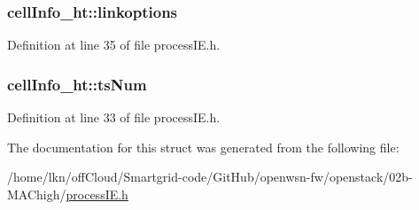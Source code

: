 \subsubsection[{\texorpdfstring{linkoptions}{linkoptions}}]{ cell\+Info\+\_\+ht\+::linkoptions}\hypertarget{structcell_info__ht_a964b11e7bb93170b463d82ad7b79e1ee}{}\label{structcell_info__ht_a964b11e7bb93170b463d82ad7b79e1ee}


Definition at line 35 of file process\+I\+E.\+h.

\subsubsection[{\texorpdfstring{ts\+Num}{tsNum}}]{ cell\+Info\+\_\+ht\+::ts\+Num}\hypertarget{structcell_info__ht_ad66acb072768400ef35d293a4c887d3d}{}\label{structcell_info__ht_ad66acb072768400ef35d293a4c887d3d}


Definition at line 33 of file process\+I\+E.\+h.



The documentation for this struct was generated from the following file\+:\begin{DoxyCompactItemize}
\item 
/home/lkn/off\+Cloud/\+Smartgrid-\/code/\+Git\+Hub/openwsn-\/fw/openstack/02b-\/\+M\+A\+Chigh/\hyperlink{process_i_e_8h}{process\+I\+E.\+h}\end{DoxyCompactItemize}
